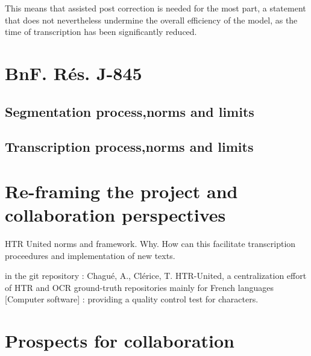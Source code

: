 \documentclass[12pt,twoside]{article}
\begin{document}
This means that assisted post correction is needed for the most part, a statement that does not nevertheless undermine the overall efficiency of the model, as the time of transcription has been significantly reduced.


\section{BnF. Rés. J-845}
\subsection{Segmentation process,norms and limits}
\subsection{Transcription process,norms and limits}

\section{Re-framing the project and collaboration perspectives}

HTR United norms and framework. Why. How can this facilitate transcription proceedures and implementation of new texts. 

\cite{chagueclerice2021}

in the git repository : Chagué, A., Clérice, T. HTR-United, a centralization effort of HTR and OCR ground-truth repositories mainly for French languages [Computer software] :
providing a quality control test for characters.

\clearpage

\section{Prospects for collaboration}

\clearpage

\tableofcontents
%
\printbibliography
%
\end{document}
